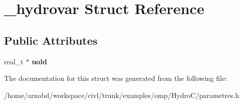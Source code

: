 \hypertarget{struct__hydrovar}{}\section{\+\_\+hydrovar Struct Reference}
\label{struct__hydrovar}
\subsection*{Public Attributes}
\begin{DoxyCompactItemize}
\item 
\hypertarget{struct__hydrovar_a8b3cd3f766ac1a697f60ed046dde8435}{}real\+\_\+t $\ast$ {\bfseries uold}\label{struct__hydrovar_a8b3cd3f766ac1a697f60ed046dde8435}

\end{DoxyCompactItemize}


The documentation for this struct was generated from the following file\+:\begin{DoxyCompactItemize}
\item 
/home/arnabd/workspace/civl/trunk/examples/omp/\+Hydro\+C/parametres.\+h\end{DoxyCompactItemize}
